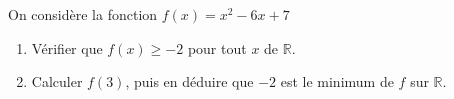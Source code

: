 \begin{Application}[][10 min]
On considère la fonction $f(x) = x^2 - 6x + 7$
\begin{enumerate}
    \item Vérifier que $f(x) \geq -2$ pour tout $x$ de $\mathbb{R}$.
    \item Calculer $f(3)$, puis en déduire que $-2$ est le minimum de $f$ sur $\mathbb{R}$.
\end{enumerate}
\end{Application}
